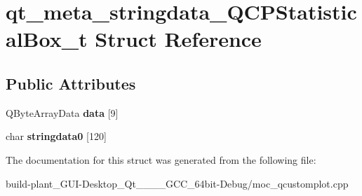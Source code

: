 \hypertarget{structqt__meta__stringdata__QCPStatisticalBox__t}{}\section{qt\+\_\+meta\+\_\+stringdata\+\_\+\+Q\+C\+P\+Statistical\+Box\+\_\+t Struct Reference}
\label{structqt__meta__stringdata__QCPStatisticalBox__t}
\subsection*{Public Attributes}
\begin{DoxyCompactItemize}
\item 
\mbox{\label{structqt__meta__stringdata__QCPStatisticalBox__t_a4da073c461b75439babf89f1a883b091}} 
Q\+Byte\+Array\+Data {\bfseries data} \mbox{[}9\mbox{]}
\item 
\mbox{\label{structqt__meta__stringdata__QCPStatisticalBox__t_a1cda43a559b6896254cc1ae2ff88fe83}} 
char {\bfseries stringdata0} \mbox{[}120\mbox{]}
\end{DoxyCompactItemize}


The documentation for this struct was generated from the following file\+:\begin{DoxyCompactItemize}
\item 
build-\/plant\+\_\+\+G\+U\+I-\/\+Desktop\+\_\+\+Qt\+\_\+\_\+\_\+\_\+\+G\+C\+C\+\_\+64bit-\/\+Debug/moc\+\_\+qcustomplot.\+cpp\end{DoxyCompactItemize}
